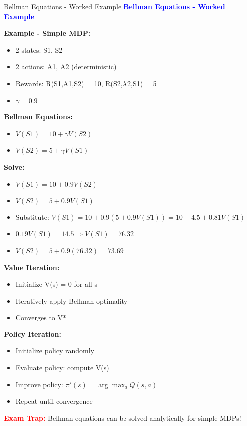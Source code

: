 \documentclass[8pt]{beamer}
\begin{document}
\begin{frame}{Bellman Equations - Worked Example}
\fontsize{6.5}{7.5}\selectfont
\textcolor{blue}{\textbf{Bellman Equations - Worked Example}}

\textbf{Example - Simple MDP:}
\begin{itemize}
\item 2 states: S1, S2
\item 2 actions: A1, A2 (deterministic)
\item Rewards: R(S1,A1,S2) = 10, R(S2,A2,S1) = 5
\item $\gamma = 0.9$
\end{itemize}

\textbf{Bellman Equations:}
\begin{itemize}
\item $V(S1) = 10 + \gamma V(S2)$
\item $V(S2) = 5 + \gamma V(S1)$
\end{itemize}

\textbf{Solve:}
\begin{itemize}
\item $V(S1) = 10 + 0.9V(S2)$
\item $V(S2) = 5 + 0.9V(S1)$
\item Substitute: $V(S1) = 10 + 0.9(5 + 0.9V(S1)) = 10 + 4.5 + 0.81V(S1)$
\item $0.19V(S1) = 14.5 \Rightarrow V(S1) = 76.32$
\item $V(S2) = 5 + 0.9(76.32) = 73.69$
\end{itemize}

\textbf{Value Iteration:}
\begin{itemize}
\item Initialize V(s) = 0 for all s
\item Iteratively apply Bellman optimality
\item Converges to V*
\end{itemize}

\textbf{Policy Iteration:}
\begin{itemize}
\item Initialize policy randomly
\item Evaluate policy: compute V(s)
\item Improve policy: $\pi'(s) = \arg\max_a Q(s,a)$
\item Repeat until convergence
\end{itemize}

\textcolor{red}{\textbf{Exam Trap:}} Bellman equations can be solved analytically for simple MDPs!
\end{frame}
\end{document}
